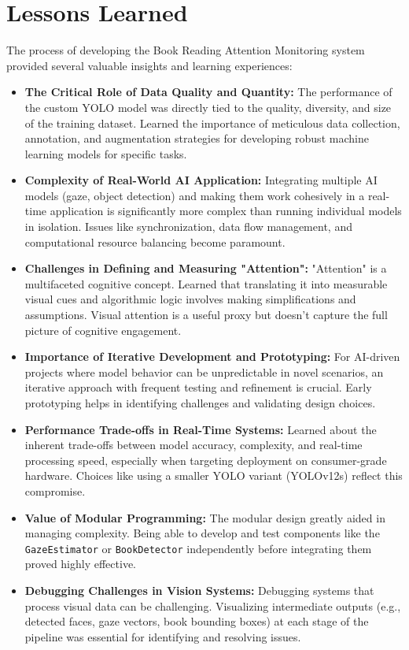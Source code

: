 \section{Lessons Learned}
The process of developing the Book Reading Attention Monitoring system provided several valuable insights and learning experiences:

\begin{itemize}
    \item \textbf{The Critical Role of Data Quality and Quantity:} The performance of the custom YOLO model was directly tied to the quality, diversity, and size of the training dataset. Learned the importance of meticulous data collection, annotation, and augmentation strategies for developing robust machine learning models for specific tasks.
    \item \textbf{Complexity of Real-World AI Application:} Integrating multiple AI models (gaze, object detection) and making them work cohesively in a real-time application is significantly more complex than running individual models in isolation. Issues like synchronization, data flow management, and computational resource balancing become paramount.
    \item \textbf{Challenges in Defining and Measuring "Attention":} "Attention" is a multifaceted cognitive concept. Learned that translating it into measurable visual cues and algorithmic logic involves making simplifications and assumptions. Visual attention is a useful proxy but doesn't capture the full picture of cognitive engagement.
    \item \textbf{Importance of Iterative Development and Prototyping:} For AI-driven projects where model behavior can be unpredictable in novel scenarios, an iterative approach with frequent testing and refinement is crucial. Early prototyping helps in identifying challenges and validating design choices.
    \item \textbf{Performance Trade-offs in Real-Time Systems:} Learned about the inherent trade-offs between model accuracy, complexity, and real-time processing speed, especially when targeting deployment on consumer-grade hardware. Choices like using a smaller YOLO variant (YOLOv12s) reflect this compromise.
    \item \textbf{Value of Modular Programming:} The modular design greatly aided in managing complexity. Being able to develop and test components like the \texttt{GazeEstimator} or \texttt{BookDetector} independently before integrating them proved highly effective.
    \item \textbf{Debugging Challenges in Vision Systems:} Debugging systems that process visual data can be challenging. Visualizing intermediate outputs (e.g., detected faces, gaze vectors, book bounding boxes) at each stage of the pipeline was essential for identifying and resolving issues.

\end{itemize}
